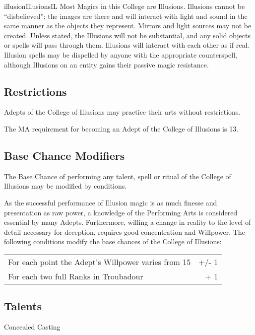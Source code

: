 \begin{college}[1.4]{illusion}{Illusions}{IL}
Most Magics in this College are Illusions.  Illusions cannot be
``disbelieved''; the images are there and will interact with light and
sound in the same manner as the objects they represent. Mirrors and
light sources may not be created. Unless stated, the Illusions will
not be substantial, and any solid objects or spells will pass through
them. Illusions will interact with each other as if real. Illusion
spells may be dispelled by anyone with the appropriate counterspell,
although Illusions on an entity gains their passive magic resistance.

\subsection{Restrictions}

Adepts of the College of Illusions may practice their arts without
restrictions.

The MA requirement for becoming an Adept of the College of Illusions
is 13.


\subsection{Base Chance Modifiers}

The Base Chance of performing any talent, spell or ritual of the
College of Illusions may be modified by conditions.

As the successful performance of Illusion magic is as much finesse and
presentation as raw power, a knowledge of the Performing Arts is
considered essential by many Adepts. Furthermore, willing a change in
reality to the level of detail necessary for deception, requires good
concentration and Willpower. The following conditions modify the base
chances of the College of Illusions:

{\small \begin{tabularx}{\linewidth}{Xr}
For each point the Adept's Willpower varies from 15	& +/- 1 \\
For each two full Ranks in Troubadour	& + 1 \\
\end{tabularx}}

\subsection{Talents}

\begin{talent}[T-1]{Concealed Casting}


\end{talent}
\end{college}
